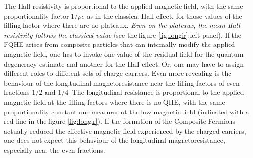 \documentclass[aps,preprint,12pt,tightenlines]{revtex4}%
\begin{document}
The Hall resistivity is proportional to the applied magnetic field, with the
same proportionality factor $1/\rho e$ as in the classical Hall effect, for
those values of the filling factor where there are no plateaux. \emph{Even on
the plateaux, the mean Hall resistivity follows the classical value} (see the
figure \ref{fig:longir}:left panel). If the FQHE arises from composite particles
that can internally modify the applied magnetic field, one has to invoke one
value of the residual field for the quantum degeneracy estimate and another
for the Hall effect. Or, one may have to assign different roles to different
sets of charge carriers. Even more revealing is the behaviour of the
longitudinal magnetoresistance near the filling factors of even fractions
$1/2$ and $1/4$. The longitudinal resistance is proportional to the applied
magnetic field at the filling factors where there is no QHE, with the same
proportionality constant one measures at the low magnetic field (indicated
with a red line in the figure \ref{fig:longir}). If the formation of the Composite
Fermions actually reduced the effective magnetic field experienced by the
charged carriers, one does not expect this behaviour of the longitudinal
magnetoresistance, especially near the even fractions.
\end{document}

